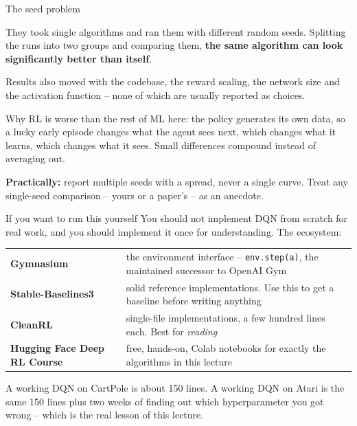 \documentclass[aspectratio=169]{beamer}
\begin{document}
\begin{frame}{The seed problem}
  \begin{tcolorbox}[colback=armorange!12, colframe=armorange, boxrule=0.7pt, arc=2pt,
                    title={\textbf{Deep RL that Matters} (Henderson et al., 2018)}]
    \small
    They took single algorithms and ran them with different random seeds. Splitting the runs
    into two groups and comparing them, \textbf{the same algorithm can look significantly better
    than itself}.

    \vskip 4pt
    Results also moved with the codebase, the reward scaling, the network size and the activation
    function -- none of which are usually reported as choices.
  \end{tcolorbox}

  \vskip 8pt
  \small
  Why RL is worse than the rest of ML here: the policy generates its own data, so a lucky early
  episode changes what the agent sees next, which changes what it learns, which changes what it
  sees. Small differences compound instead of averaging out.

  \vskip 8pt
  \begin{tcolorbox}[colback=paramgreen!8, colframe=paramgreen, boxrule=0.6pt, arc=2pt]
    \small
    \textbf{Practically:} report multiple seeds with a spread, never a single curve. Treat any
    single-seed comparison -- yours or a paper's -- as an anecdote.
  \end{tcolorbox}
\end{frame}

\begin{frame}{If you want to run this yourself}
  \small
  You should not implement DQN from scratch for real work, and you should implement it once for
  understanding. The ecosystem:

  \vskip 8pt
  \begin{center}
  \footnotesize
  \begin{tabular}{l l}
    \toprule
    \textbf{Gymnasium} & the environment interface -- \texttt{env.step(a)}, the maintained
      successor to OpenAI Gym \\[3pt]
    \textbf{Stable-Baselines3} & solid reference implementations. Use this to get a baseline
      before writing anything \\[3pt]
    \textbf{CleanRL} & single-file implementations, a few hundred lines each. Best for
      \emph{reading} \\[3pt]
    \textbf{Hugging Face Deep RL Course} & free, hands-on, Colab notebooks for exactly the
      algorithms in this lecture \\
    \bottomrule
  \end{tabular}
  \end{center}

  \vskip 10pt
  \begin{tcolorbox}[colback=armblue!8, colframe=armblue, boxrule=0.6pt, arc=2pt]
    \small
    A working DQN on CartPole is about 150 lines. A working DQN on Atari is the same 150 lines
    plus two weeks of finding out which hyperparameter you got wrong -- which is the real
    lesson of this lecture.
  \end{tcolorbox}
\end{frame}
\end{document}
